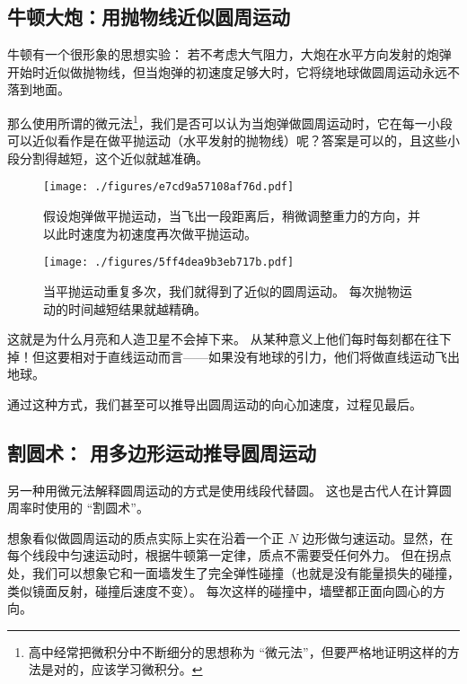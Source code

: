 

\begin{issues}
\issueDraft
\end{issues}

\subsection{牛顿大炮：用抛物线近似圆周运动}
牛顿有一个很形象的思想实验： 若不考虑大气阻力，大炮在水平方向发射的炮弹开始时近似做抛物线，但当炮弹的初速度足够大时，它将绕地球做圆周运动永远不落到地面。


那么使用所谓的微元法\footnote{高中经常把微积分中不断细分的思想称为 “微元法”，但要严格地证明这样的方法是对的，应该学习微积分。}，我们是否可以认为当炮弹做圆周运动时，它在每一小段可以近似看作是在做平抛运动（水平发射的抛物线）呢？答案是可以的，且这些小段分割得越短，这个近似就越准确。


\begin{figure}[ht]
\centering
\texttt{[image: ./figures/e7cd9a57108af76d.pdf]}
\caption{假设炮弹做平抛运动，当飞出一段距离后，稍微调整重力的方向，并以此时速度为初速度再次做平抛运动。} \label{fig_CMintr_1}
\end{figure}

\begin{figure}[ht]
\centering
\texttt{[image: ./figures/5ff4dea9b3eb717b.pdf]}
\caption{当平抛运动重复多次，我们就得到了近似的圆周运动。 每次抛物运动的时间越短结果就越精确。} \label{fig_CMintr_2}
\end{figure}




这就是为什么月亮和人造卫星不会掉下来。 从某种意义上他们每时每刻都在往下掉！但这要相对于直线运动而言——如果没有地球的引力，他们将做直线运动飞出地球。

通过这种方式，我们甚至可以推导出圆周运动的向心加速度，过程见最后。


\subsection{割圆术： 用多边形运动推导圆周运动}
另一种用微元法解释圆周运动的方式是使用线段代替圆。 这也是古代人在计算圆周率时使用的 “割圆术”。

想象看似做圆周运动的质点实际上实在沿着一个正 $N$ 边形做匀速运动。显然，在每个线段中匀速运动时，根据牛顿第一定律，质点不需要受任何外力。 但在拐点处，我们可以想象它和一面墙发生了完全弹性碰撞（也就是没有能量损失的碰撞，类似镜面反射，碰撞后速度不变）。 每次这样的碰撞中，墙壁都正面向圆心的方向。

